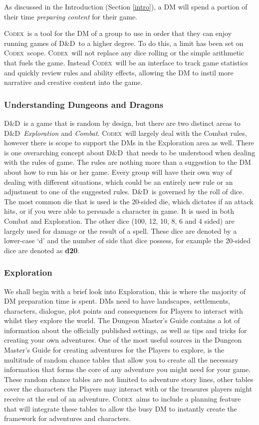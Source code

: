 \documentclass[final]{cmpreport}
\newcommand{\dnd}{D\&D}
\newcommand{\Codex}{\textsc{Codex}}
\begin{document}
	As discussed in the Introduction (Section \ref{intro}), a DM will spend a portion of their time \emph{preparing content} for their game. 
	
	\Codex \ is a tool for the DM of a group to use in order that they can enjoy running games of \dnd \ to a higher degree. To do this, a limit has been set on \Codex \ scope. \Codex \ will not replace any dice rolling or the simple arithmetic that fuels the game. Instead \Codex \ will be an interface to track game statistics and quickly review rules and ability effects,  allowing the DM to instil more narrative and creative content into the game.
	
	\subsubsection{Understanding Dungeons and Dragons}
	\dnd \ is a game that is random by design, but there are two distinct areas to \dnd \, \emph{Exploration} and \emph{Combat}. \Codex \ will largely deal with the Combat rules, however there is scope to support the DMs in the Exploration area as well. There is one overarching concept about \dnd \ that needs to be understood when dealing with the rules of game. The rules are nothing more than a suggestion to the DM about how to run his or her game. Every group will have their own way of dealing with different situations, which could be an entirely new rule or an adjustment to one of the suggested rules. \dnd \ is governed by the roll of dice. The most common die that is used is the 20-sided die, which dictates if an attack hits, or if you were able to persuade a character in game. It is used in both Combat and Exploration. The other dice (100, 12, 10, 8, 6 and 4 sided) are largely used for damage or the result of a spell. These dice are denoted by a lower-case `d' and the number of side that dice possess, for example the 20-sided dice are denoted as \textbf{d20}.
	
	\subsubsection{Exploration} \label{DnDExplore}
	We shall begin with a brief look into Exploration, this is where the majority of DM preparation time is spent. DMs need to have landscapes, settlements, characters, dialogue, plot points and consequences for Players to interact with whilst they explore the world. The Dungeon Master's Guide \citep{DMGuide} contains a lot of information about the officially published settings, as well as tips and tricks for creating your own adventures. One of the most useful sources in the Dungeon Master's Guide for creating adventures for the Players to explore, is the multitude of random chance tables that allow you to create all the necessary information that forms the core of any adventure you might need for your game. These random chance tables are not limited to adventure story lines, other tables cover the characters the Players may interact with or the treasures players might receive at the end of an adventure. \Codex \ aims to include a planning feature that will integrate these tables to allow the busy DM to instantly create the framework for adventures and characters. 
	
\end{document}

